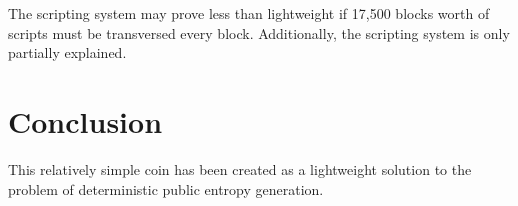 \documentclass[twocolumn]{article}
\begin{document}
The scripting system may prove less than lightweight if 17,500 blocks worth of scripts must be transversed every block.
Additionally, the scripting system is only partially explained.

\section{Conclusion}
This relatively simple coin has been created as a lightweight solution to the problem of deterministic public entropy generation.
\end{document}
